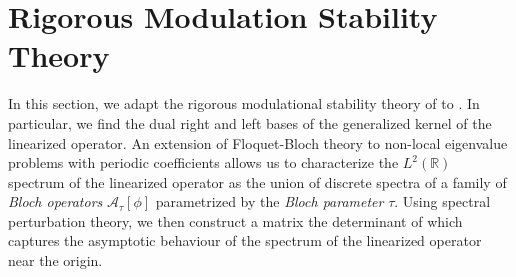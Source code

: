 \documentclass[11pt,leqno]{article}
\numberwithin{equation}{section}
\newcommand{\R}{\mathbb R}
\theoremstyle{definition}
\begin{document}
\section{Rigorous Modulation Stability Theory}\label{S:RigorousTheory}
In this section, we adapt the rigorous modulational stability theory of \cite{BNR14,JP2020} to . In particular, we find the dual right and left bases of the generalized kernel of the linearized operator. An extension of Floquet-Bloch theory to non-local eigenvalue problems with periodic coefficients \cite{J13} allows us to characterize the $ L^{2}(\R) $ spectrum of the linearized operator as the union of discrete spectra of a family of \textit{Bloch operators} $ \mathcal{A}_{\tau}[\phi] $ parametrized by the \textit{Bloch parameter} $ \tau $. Using spectral perturbation theory, we then construct a matrix the determinant of which captures the asymptotic behaviour of the spectrum of the linearized operator near the origin.
\end{document}
